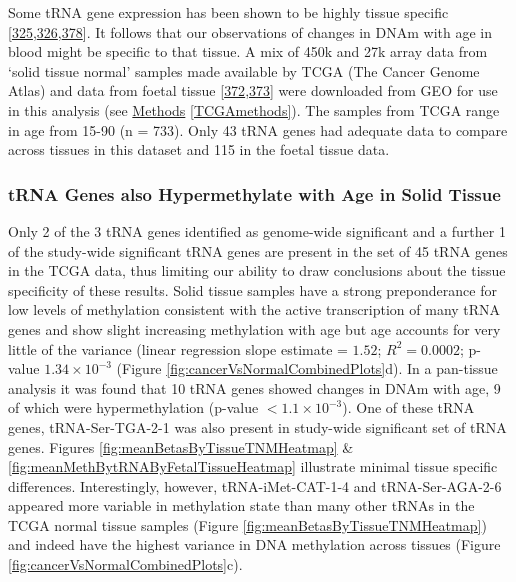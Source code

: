 \documentclass[
]{book}
\begin{document}
Some tRNA gene expression has been shown to be highly tissue specific {[}\protect\hyperlink{ref-Dittmar2006}{325},\protect\hyperlink{ref-Sagi2016}{326},\protect\hyperlink{ref-Schmitt2014b}{378}{]}.
It follows that our observations of changes in DNAm with age in blood might be specific to that tissue.
A mix of 450k and 27k array data from `solid tissue normal' samples made available by TCGA (The Cancer Genome Atlas) and data from foetal tissue {[}\protect\hyperlink{ref-Yang2016}{372},\protect\hyperlink{ref-Nazor2012}{373}{]} were downloaded from GEO for use in this analysis (see \protect\hyperlink{TCGAmethods}{Methods} \ref{TCGAmethods}).
The samples from TCGA range in age from 15-90 (n = 733).
Only 43 tRNA genes had adequate data to compare across tissues in this dataset and 115 in the foetal tissue data.

\hypertarget{trna-genes-also-hypermethylate-with-age-in-solid-tissue}{%
\subsubsection{tRNA Genes also Hypermethylate with Age in Solid Tissue}\label{trna-genes-also-hypermethylate-with-age-in-solid-tissue}}

Only 2 of the 3 tRNA genes identified as genome-wide significant and a further 1 of the study-wide significant tRNA genes are present in the set of 45 tRNA genes in the TCGA data, thus limiting our ability to draw conclusions about the tissue specificity of these results.
Solid tissue samples have a strong preponderance for low levels of methylation consistent with the active transcription of many tRNA genes and show slight increasing methylation with age but age accounts for very little of the variance (linear regression slope estimate = \(1.52\); \(R^2= 0.0002\); p-value \(1.34\times10^{-3}\) (Figure \ref{fig:cancerVsNormalCombinedPlots}d).
In a pan-tissue analysis it was found that 10 tRNA genes showed changes in DNAm with age, 9 of which were hypermethylation (p-value \(<1.1\times10^{-3}\)).
One of these tRNA genes, tRNA-Ser-TGA-2-1 was also present in study-wide significant set of tRNA genes.
Figures \ref{fig:meanBetasByTissueTNMHeatmap} \& \ref{fig:meanMethBytRNAByFetalTissueHeatmap} illustrate minimal tissue specific differences.
Interestingly, however, tRNA-iMet-CAT-1-4 and tRNA-Ser-AGA-2-6 appeared more variable in methylation state than many other tRNAs in the TCGA normal tissue samples (Figure \ref{fig:meanBetasByTissueTNMHeatmap}) and indeed have the highest variance in DNA methylation across tissues (Figure \ref{fig:cancerVsNormalCombinedPlots}c).
\end{document}
